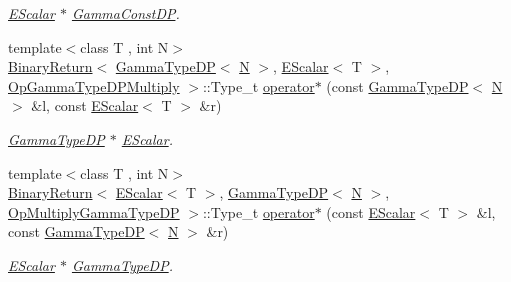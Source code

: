 \begin{DoxyCompactItemize}
\begin{DoxyCompactList}\small\item\em \mbox{\hyperlink{classENSEM_1_1EScalar}{E\+Scalar}} $\ast$ \mbox{\hyperlink{classENSEM_1_1GammaConstDP}{Gamma\+Const\+DP}}. \end{DoxyCompactList}\item 
{\footnotesize template$<$class T , int N$>$ }\\\mbox{\hyperlink{structENSEM_1_1BinaryReturn}{Binary\+Return}}$<$ \mbox{\hyperlink{classENSEM_1_1GammaTypeDP}{Gamma\+Type\+DP}}$<$ \mbox{\hyperlink{operator__name__util_8cc_a7722c8ecbb62d99aee7ce68b1752f337}{N}} $>$, \mbox{\hyperlink{classENSEM_1_1EScalar}{E\+Scalar}}$<$ T $>$, \mbox{\hyperlink{structENSEM_1_1OpGammaTypeDPMultiply}{Op\+Gamma\+Type\+D\+P\+Multiply}} $>$\+::Type\+\_\+t \mbox{\hyperlink{group__escalar_ga54ffca46c333d9dad30043eb6cef6299}{operator$\ast$}} (const \mbox{\hyperlink{classENSEM_1_1GammaTypeDP}{Gamma\+Type\+DP}}$<$ \mbox{\hyperlink{operator__name__util_8cc_a7722c8ecbb62d99aee7ce68b1752f337}{N}} $>$ \&l, const \mbox{\hyperlink{classENSEM_1_1EScalar}{E\+Scalar}}$<$ T $>$ \&r)
\begin{DoxyCompactList}\small\item\em \mbox{\hyperlink{classENSEM_1_1GammaTypeDP}{Gamma\+Type\+DP}} $\ast$ \mbox{\hyperlink{classENSEM_1_1EScalar}{E\+Scalar}}. \end{DoxyCompactList}\item 
{\footnotesize template$<$class T , int N$>$ }\\\mbox{\hyperlink{structENSEM_1_1BinaryReturn}{Binary\+Return}}$<$ \mbox{\hyperlink{classENSEM_1_1EScalar}{E\+Scalar}}$<$ T $>$, \mbox{\hyperlink{classENSEM_1_1GammaTypeDP}{Gamma\+Type\+DP}}$<$ \mbox{\hyperlink{operator__name__util_8cc_a7722c8ecbb62d99aee7ce68b1752f337}{N}} $>$, \mbox{\hyperlink{structENSEM_1_1OpMultiplyGammaTypeDP}{Op\+Multiply\+Gamma\+Type\+DP}} $>$\+::Type\+\_\+t \mbox{\hyperlink{group__escalar_ga546f1e55f2e4eda7a887fbf4fcaa177f}{operator$\ast$}} (const \mbox{\hyperlink{classENSEM_1_1EScalar}{E\+Scalar}}$<$ T $>$ \&l, const \mbox{\hyperlink{classENSEM_1_1GammaTypeDP}{Gamma\+Type\+DP}}$<$ \mbox{\hyperlink{operator__name__util_8cc_a7722c8ecbb62d99aee7ce68b1752f337}{N}} $>$ \&r)
\begin{DoxyCompactList}\small\item\em \mbox{\hyperlink{classENSEM_1_1EScalar}{E\+Scalar}} $\ast$ \mbox{\hyperlink{classENSEM_1_1GammaTypeDP}{Gamma\+Type\+DP}}. \end{DoxyCompactList}\item 

\end{DoxyCompactItemize}
